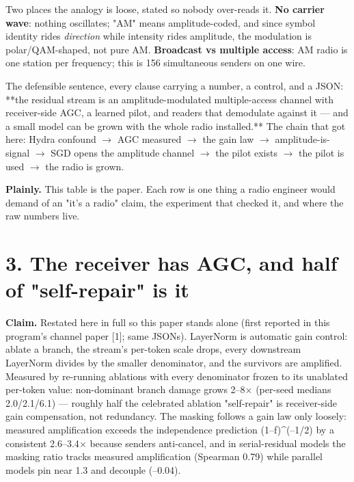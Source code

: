 \documentclass[10pt]{article}
\begin{document}
Two places the analogy is loose, stated so nobody over-reads it. \textbf{No carrier wave}: nothing
oscillates; "AM" means amplitude-coded, and since symbol identity rides \emph{direction} while intensity
rides amplitude, the modulation is polar/QAM-shaped, not pure AM. \textbf{Broadcast vs multiple access}:
AM radio is one station per frequency; this is 156 simultaneous senders on one wire.

The defensible sentence, every clause carrying a number, a control, and a JSON: **the residual
stream is an amplitude-modulated multiple-access channel with receiver-side AGC, a learned pilot,
and readers that demodulate against it --- and a small model can be grown with the whole radio
installed.** The chain that got here: Hydra confound $\to$ AGC measured $\to$ the gain law $\to$
amplitude-is-signal $\to$ SGD opens the amplitude channel $\to$ the pilot exists $\to$ the pilot is used $\to$
the radio is grown.

\textbf{Plainly.} This table is the paper. Each row is one thing a radio engineer would demand of an
"it's a radio" claim, the experiment that checked it, and where the raw numbers live.

\section{3. The receiver has AGC, and half of "self-repair" is it}

\textbf{Claim.} Restated here in full so this paper stands alone (first reported in this program's
channel paper [1]; same JSONs). LayerNorm is automatic gain control: ablate a branch, the stream's
per-token scale drops, every downstream LayerNorm divides by the smaller denominator, and the
survivors are amplified. Measured by re-running ablations with every denominator frozen to its
unablated per-token value: non-dominant branch damage grows 2--8$\times$ (per-seed medians 2.0/2.1/6.1) ---
roughly half the celebrated ablation "self-repair" is receiver-side gain compensation, not
redundancy. The masking follows a gain law only loosely: measured amplification exceeds the
independence prediction (1--f)\textasciicircum{}(--1/2) by a consistent 2.6--3.4$\times$ because senders anti-cancel, and in
serial-residual models the masking ratio tracks measured amplification (Spearman 0.79) while
parallel models pin near 1.3 and decouple (--0.04).
\end{document}
